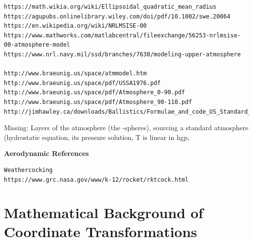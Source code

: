 \documentclass[11pt,dvipsnames]{thesis}
\begin{document}
\begin{verbatim}
https://math.wikia.org/wiki/Ellipsoidal_quadratic_mean_radius
https://agupubs.onlinelibrary.wiley.com/doi/pdf/10.1002/swe.20064
https://en.wikipedia.org/wiki/NRLMSISE-00
https://www.mathworks.com/matlabcentral/fileexchange/56253-nrlmsise-00-atmosphere-model
https://www.nrl.navy.mil/ssd/branches/7630/modeling-upper-atmosphere

http://www.braeunig.us/space/atmmodel.htm
http://www.braeunig.us/space/pdf/USSA1976.pdf
http://www.braeunig.us/space/pdf/Atmosphere_0-90.pdf
http://www.braeunig.us/space/pdf/Atmosphere_90-110.pdf
http://jimhawley.ca/downloads/Ballistics/Formulae_and_code_US_Standard_Atmosphere_1976.pdf
\end{verbatim}
Missing: Layers of the atmosphere (the -spheres), sourcing a standard atmosphere (hydrostatic equation, its pressure solution, T is linear in hgp, 

{\centering\textbf{\Large Aerodynamic References}}
\begin{verbatim}
Weathercocking
https://www.grc.nasa.gov/www/k-12/rocket/rktcock.html
\end{verbatim}















\appendix
\chapter{Mathematical Background of Coordinate Transformations}
\end{document}
